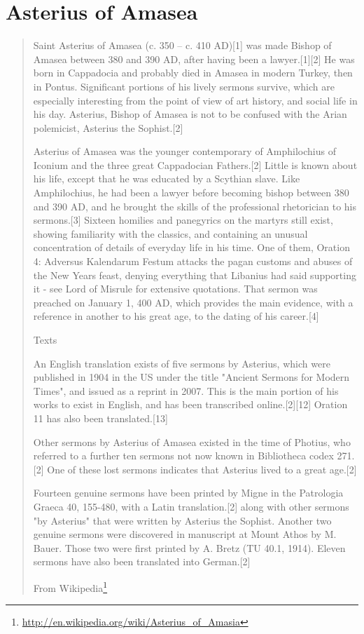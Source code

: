 \documentclass[12pt,letterpaper,twoside,final]{memoir}
\begin{document}
\section{Asterius of Amasea}
\blockquote[From Wikipedia\footnote{\url{http://en.wikipedia.org/wiki/Asterius_of_Amasia}}]{Saint Asterius of Amasea (c. 350 – c. 410 AD)[1] was made Bishop of Amasea between 380 and 390 AD, after having been a lawyer.[1][2] He was born in Cappadocia and probably died in Amasea in modern Turkey, then in Pontus. Significant portions of his lively sermons survive, which are especially interesting from the point of view of art history, and social life in his day. Asterius, Bishop of Amasea is not to be confused with the Arian polemicist, Asterius the Sophist.[2]

Asterius of Amasea was the younger contemporary of Amphilochius of Iconium and the three great Cappadocian Fathers.[2] Little is known about his life, except that he was educated by a Scythian slave. Like Amphilochius, he had been a lawyer before becoming bishop between 380 and 390 AD, and he brought the skills of the professional rhetorician to his sermons.[3] Sixteen homilies and panegyrics on the martyrs still exist, showing familiarity with the classics, and containing an unusual concentration of details of everyday life in his time. One of them, Oration 4: Adversus Kalendarum Festum attacks the pagan customs and abuses of the New Years feast, denying everything that Libanius had said supporting it - see Lord of Misrule for extensive quotations. That sermon was preached on January 1, 400 AD, which provides the main evidence, with a reference in another to his great age, to the dating of his career.[4]

Texts

An English translation exists of five sermons by Asterius, which were published in 1904 in the US under the title "Ancient Sermons for Modern Times", and issued as a reprint in 2007. This is the main portion of his works to exist in English, and has been transcribed online.[2][12] Oration 11 has also been translated.[13]

Other sermons by Asterius of Amasea existed in the time of Photius, who referred to a further ten sermons not now known in Bibliotheca codex 271.[2] One of these lost sermons indicates that Asterius lived to a great age.[2]

Fourteen genuine sermons have been printed by Migne in the Patrologia Graeca 40, 155-480, with a Latin translation.[2] along with other sermons "by Asterius" that were written by Asterius the Sophist. Another two genuine sermons were discovered in manuscript at Mount Athos by M. Bauer. Those two were first printed by A. Bretz (TU 40.1, 1914). Eleven sermons have also been translated into German.[2]}
\end{document}
